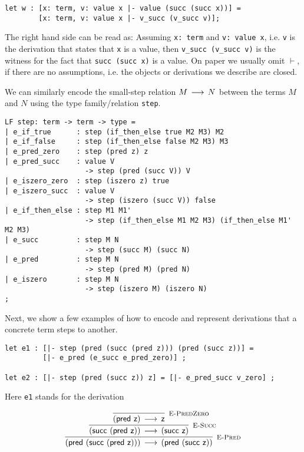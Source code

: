 \begin{lstlisting}
let w : [x: term, v: value x |- value (succ (succ x))] =
        [x: term, v: value x |- v_succ (v_succ v)];
\end{lstlisting}

The right hand side can be read as: Assuming \lstinline!x: term! and
\lstinline!v: value x!, i.e. \lstinline!v! is the derivation that states that
\lstinline!x! is a value, then \lstinline!v_succ (v_succ v)! is the witness for
the fact that \lstinline!succ (succ x)! is a value. On paper we usually omit
$\vdash$, if there are no assumptions, i.e. the objects or derivations we
describe are closed.

We can similarly encode the small-step relation $M \mathrel{\,\longrightarrow\,} N$  between the terms
$M$ and $N$ using the type family/relation \lstinline!step!.

\begin{lstlisting}
LF step: term -> term -> type =
| e_if_true      : step (if_then_else true M2 M3) M2
| e_if_false     : step (if_then_else false M2 M3) M3
| e_pred_zero    : step (pred z) z
| e_pred_succ    : value V
                   -> step (pred (succ V)) V
| e_iszero_zero  : step (iszero z) true
| e_iszero_succ  : value V
                   -> step (iszero (succ V)) false
| e_if_then_else : step M1 M1'
                   -> step (if_then_else M1 M2 M3) (if_then_else M1' M2 M3)
| e_succ         : step M N
                   -> step (succ M) (succ N)
| e_pred         : step M N
                   -> step (pred M) (pred N)
| e_iszero       : step M N
                   -> step (iszero M) (iszero N)
;
\end{lstlisting}

Next, we show a few examples of how to encode and represent derivations that a
concrete term steps to another.

\begin{lstlisting}
let e1 : [|- step (pred (succ (pred z))) (pred (succ z))] =
         [|- e_pred (e_succ e_pred_zero)] ;

let e2 : [|- step (pred (succ z)) z] = [|- e_pred_succ v_zero] ;
\end{lstlisting}

Here \lstinline!e1! stands for the derivation

\[
\begin{array}{c}
\infer[\EPred]{(\tmpred {(\tmsucc {(\tmpred {\tmzero})})}) \Steps (\tmpred {(\tmsucc {\tmzero})})}
{\infer[\ESucc]{(\tmsucc {(\tmpred {\tmzero})}) \Steps (\tmsucc {\tmzero} )}
 {\infer[\EPredZ]{(\tmpred {\tmzero}) \Steps \tmzero}{}}
}
\end{array}
\]


